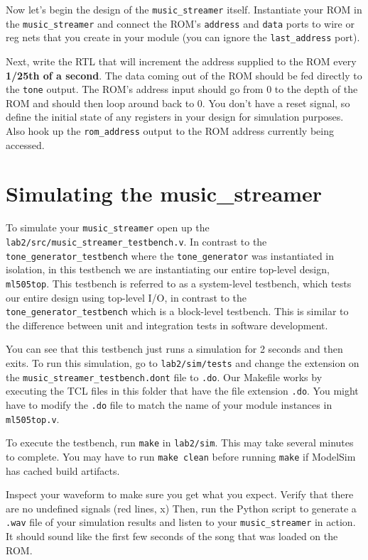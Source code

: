 \documentclass[11pt]{article}
\begin{document}
Now let's begin the design of the \verb|music_streamer| itself. Instantiate your ROM in the \verb|music_streamer| and connect the ROM's \verb|address| and \verb|data| ports to wire or reg nets that you create in your module (you can ignore the \verb|last_address| port).

Next, write the RTL that will increment the address supplied to the ROM every \textbf{1/25th of a second}. The data coming out of the ROM should be fed directly to the \verb|tone| output. The ROM's address input should go from 0 to the depth of the ROM and should then loop around back to 0. You don't have a reset signal, so define the initial state of any registers in your design for simulation purposes. Also hook up the \verb|rom_address| output to the ROM address currently being accessed.

\section{Simulating the music\_streamer}
To simulate your \verb|music_streamer| open up the \verb|lab2/src/music_streamer_testbench.v|. In contrast to the \verb|tone_generator_testbench| where the \verb|tone_generator| was instantiated in isolation, in this testbench we are instantiating our entire top-level design, \verb|ml505top|. This testbench is referred to as a system-level testbench, which tests our entire design using top-level I/O, in contrast to the \verb|tone_generator_testbench| which is a block-level testbench. This is similar to the difference between unit and integration tests in software development.

You can see that this testbench just runs a simulation for 2 seconds and then exits. To run this simulation, go to \verb|lab2/sim/tests| and change the extension on the \verb|music_streamer_testbench.dont| file to \verb|.do|. Our Makefile works by executing the TCL files in this folder that have the file extension \verb|.do|. You might have to modify the \verb|.do| file to match the name of your module instances in \verb|ml505top.v|.

To execute the testbench, run \verb|make| in \verb|lab2/sim|. This may take several minutes to complete. You may have to run \verb|make clean| before running \verb|make| if ModelSim has cached build artifacts.

Inspect your waveform to make sure you get what you expect. Verify that there are no undefined signals (red lines, x) Then, run the Python script to generate a \verb|.wav| file of your simulation results and listen to your \verb|music_streamer| in action. It should sound like the first few seconds of the song that was loaded on the ROM.
\end{document}

